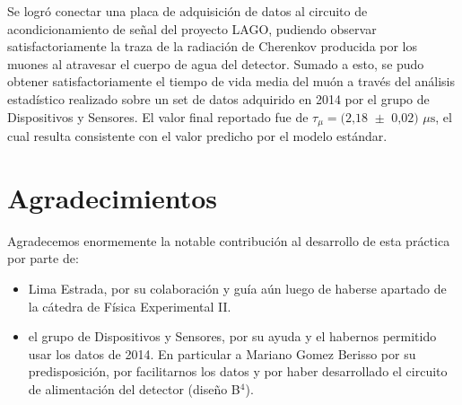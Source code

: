 \documentclass[twocolumn , reprint, a4paper, 12pt]{article}
\begin{document}
Se logró conectar una placa de adquisición de datos al circuito de acondicionamiento de señal del proyecto LAGO, pudiendo 
observar satisfactoriamente la traza de la radiación de Cherenkov producida por los muones 
al atravesar el cuerpo de agua del detector. Sumado a esto, se pudo obtener satisfactoriamente el tiempo
de vida media del muón a través del análisis estadístico realizado sobre un set de datos adquirido en 2014
por el grupo de Dispositivos y Sensores. El valor final reportado fue de $\tau_\mu = \text{(2,18 $\pm$ 0,02) $\mu$s}$,
el cual resulta consistente con el valor predicho por el modelo estándar.

\section*{Agradecimientos}

Agradecemos enormemente la notable contribución al desarrollo de esta práctica por parte de:
\begin{itemize}
    \item Lima Estrada, por su colaboración y guía aún luego de haberse apartado de la cátedra de Física Experimental II.
    \item el grupo de Dispositivos y Sensores, por su ayuda y el habernos permitido usar los datos de 2014. En particular a Mariano Gomez Berisso por su predisposición,
    por facilitarnos los datos y por haber desarrollado el circuito de alimentación del detector (diseño B$^\text{4}$).
\end{itemize}

\vspace{2cm}



\end{document}
